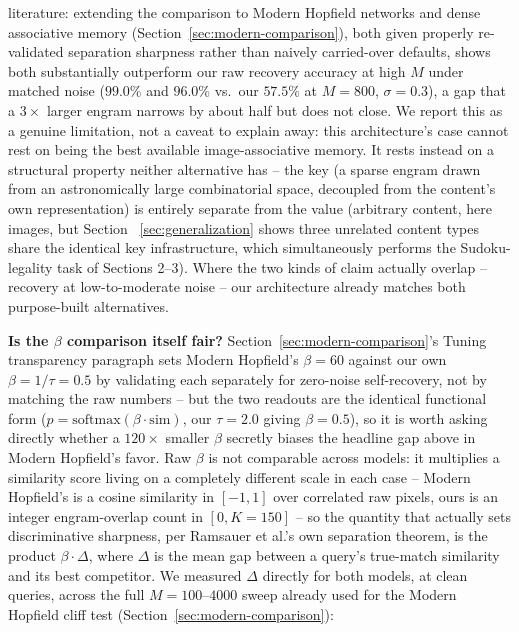 \documentclass[11pt]{article}
\begin{document}
literature: extending the comparison to Modern Hopfield networks and dense associative memory
(Section~\ref{sec:modern-comparison}), both given properly re-validated separation sharpness
rather than naively carried-over defaults, shows both substantially outperform our raw
recovery accuracy at high $M$ under matched noise ($99.0\%$ and $96.0\%$ vs.\ our $57.5\%$ at
$M{=}800$, $\sigma{=}0.3$), a gap that a $3\times$ larger engram narrows by about half but does
not close. We report this as a genuine limitation, not a caveat to explain away: this
architecture's case cannot rest on being the best available image-associative memory. It rests
instead on a structural property neither alternative has -- the key (a sparse engram drawn from
an astronomically large combinatorial space, decoupled from the content's own representation)
is entirely separate from the value (arbitrary content, here images, but Section~
\ref{sec:generalization} shows three unrelated content types share the identical key
infrastructure, which simultaneously performs the Sudoku-legality task of Sections 2--3). Where
the two kinds of claim actually overlap -- recovery at low-to-moderate noise -- our architecture
already matches both purpose-built alternatives.

\textbf{Is the $\beta$ comparison itself fair?} Section~\ref{sec:modern-comparison}'s Tuning
transparency paragraph sets Modern Hopfield's $\beta{=}60$ against our own $\beta{=}1/\tau{=}0.5$
by validating each separately for zero-noise self-recovery, not by matching the raw numbers --
but the two readouts are the identical functional form
($p=\mathrm{softmax}(\beta\cdot\mathrm{sim})$, our $\tau{=}2.0$ giving $\beta{=}0.5$), so it is
worth asking directly whether a $120\times$ smaller $\beta$ secretly biases the headline gap
above in Modern Hopfield's favor. Raw $\beta$ is not comparable across models: it multiplies a
similarity score living on a completely different scale in each case -- Modern Hopfield's is a
cosine similarity in $[-1,1]$ over correlated raw pixels, ours is an integer engram-overlap count
in $[0,K{=}150]$ -- so the quantity that actually sets discriminative sharpness, per Ramsauer et
al.'s own separation theorem, is the product $\beta\cdot\Delta$, where $\Delta$ is the mean gap
between a query's true-match similarity and its best competitor. We measured $\Delta$ directly
for both models, at clean queries, across the full $M{=}100$--$4000$ sweep already used for the
Modern Hopfield cliff test (Section~\ref{sec:modern-comparison}):
\end{document}
